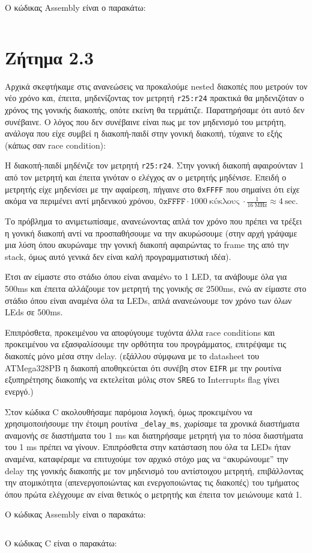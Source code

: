 \documentclass[a4paper]{article}
\begin{document}
Ο κώδικας Assembly είναι ο παρακάτω:
\inputminted[breaklines, linenos]{gas}{../Lab2.2/main.asm}


\section{Ζήτημα 2.3}

\par Αρχικά σκεφτήκαμε στις ανανεώσεις να προκαλούμε nested διακοπές που μετρούν τον νέο χρόνο και, έπειτα, μηδενίζοντας τον μετρητή
\texttt{r25:r24} πρακτικά θα μηδενιζόταν ο χρόνος της γονικής διακοπής, οπότε εκείνη θα τερμάτιζε. Παρατηρήσαμε ότι αυτό δεν συνέβαινε.
Ο λόγος που δεν συνέβαινε είναι πως με τον μηδενισμό του μετρήτη, ανάλογα που είχε συμβεί η διακοπή-παιδί στην γονική διακοπή, τύχαινε το εξής
(κάπως σαν race condition):

\par Η διακοπή-παιδί μηδένιζε τον μετρητή \texttt{r25:r24}. Στην γονική διακοπή αφαιρούνταν 1 από τον μετρητή και έπειτα γινόταν ο ελέγχος
αν ο μετρητής μηδένισε. Επειδή ο μετρητής είχε μηδενίσει με την αφαίρεση, πήγαινε στο \texttt{0xFFFF} που σημαίνει ότι είχε ακόμα να περιμένει αντί
μηδενικού χρόνου,
$\mathtt{0 \text{x} FFFF} \cdot 1000\ \text{κύκλους}\ \cdot \frac{1}{16\ \text{MHz}} \approx 4\ \text{sec}$.

\par Το πρόβλημα το ανιμετωπίσαμε, ανανεώνοντας απλά τον χρόνο που πρέπει να τρέξει η γονική διακοπή αντί να προσπαθήσουμε
να την ακυρώσουμε (στην αρχή γράψαμε μια λύση όπου ακυρώναμε την γονική διακοπή αφαιρώντας το frame της από την stack, όμως αυτό
γενικά δεν είναι καλή προγραμματιστική ιδέα).
\par Έτσι αν είμαστε στο στάδιο όπου είναι αναμένo το 1 LED, τα ανάβουμε όλα για 500ms και έπειτα αλλάζουμε τον μετρητή της γονικής σε 2500ms,
ενώ αν είμαστε στο στάδιο όπου είναι αναμένα όλα τα LEDs, απλά ανανεώνουμε τον χρόνο των όλων LEds σε 500ms.
\par Επιπρόσθετα, προκειμένου να αποφύγουμε τυχόντα άλλα race conditions και προκειμένου να εξασφαλίσουμε την ορθότητα του προγράμματος,
επιτρέψαμε τις διακοπές μόνο μέσα στην delay. (εξάλλου σύμφωνα με το datasheet του ATMega328PB η διακοπή αποθηκεύεται ότι συνέβη στον \texttt{EIFR}
με την ρουτίνα εξυπηρέτησης διακοπής να εκτελείται μόλις στον \texttt{SREG} το Interrupts flag γίνει ενεργό.)
\par Στον κώδικα C ακολουθήσαμε παρόμοια λογική, όμως προκειμένου να χρησιμοποιήσουμε την έτοιμη ρουτίνα \texttt{\_delay\_ms},
χωρίσαμε τα χρονικά διαστήματα αναμονής σε διαστήματα του 1 ms και διατηρήσαμε μετρητή για το πόσα διαστήματα του 1 ms πρέπει να γίνουν.
Επιπρόσθετα στην κατάσταση που όλα τα LEDs ήταν αναμένα, καταφέραμε να επιτυχούμε τον αρχικό στόχο μας να ``ακυρώνουμε'' την delay της γονικής
διακοπής με τον μηδενισμό του αντίστοιχου μετρητή, επιβάλλοντας την ατομικότητα (απενεργοποιώντας και ενεργοποιώντας τις διακοπές) του τμήματος
όπου πρώτα ελέγχουμε αν είναι θετικός ο μετρητής και έπειτα τον μειώνουμε κατά 1.

Ο κώδικας Assembly είναι ο παρακάτω:
\inputminted[breaklines, linenos]{gas}{../Lab2.3/main_k.asm}

Ο κώδικας C είναι ο παρακάτω:
\inputminted[breaklines, linenos]{c}{../Lab2.3/main_k.c}
\end{document}
